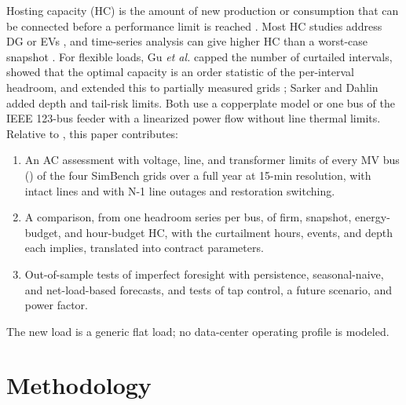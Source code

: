 \documentclass[conference,letterpaper]{IEEEtran}
\begin{document}
Hosting capacity (HC) is the amount of new production or consumption that can be connected before a performance limit is reached \cite{bollen2017}. Most HC studies address DG \cite{ismael2019,benzerga2025,mulenga2020} or EVs \cite{umoh2023}, and time-series analysis can give higher HC than a worst-case snapshot \cite{jain2019}. For flexible loads, Gu \emph{et al.} \cite{gu2026hicss} capped the number of curtailed intervals, showed that the optimal capacity is an order statistic of the per-interval headroom, and extended this to partially measured grids \cite{gu2026eenergy}; Sarker and Dahlin \cite{sarker2026} added depth and tail-risk limits. Both use a copperplate model or one bus of the IEEE 123-bus feeder with a linearized power flow without line thermal limits. Relative to \cite{gu2026hicss,sarker2026}, this paper contributes:
\begin{enumerate}
\item An AC assessment with voltage, line, and transformer limits of every MV bus (\nBus) of the four SimBench grids \cite{simbench} over a full year at 15-min resolution, with intact lines and with N-1 line outages and restoration switching.
\item A comparison, from one headroom series per bus, of firm, snapshot, energy-budget, and hour-budget HC, with the curtailment hours, events, and depth each implies, translated into contract parameters.
\item Out-of-sample tests of imperfect foresight with persistence, seasonal-naive, and net-load-based forecasts, and tests of tap control, a future scenario, and power factor.
\end{enumerate}
The new load is a generic flat load; no data-center operating profile is modeled.

\section{Methodology}
\end{document}
